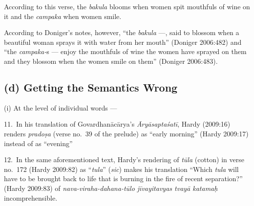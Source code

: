 According to this verse, the \textsl{bakula} blooms when women spit mouthfuls of wine on it and the \textsl{campaka} when women smile. 

According to Doniger’s notes, however, “the \textsl{bakula} ---, said to blossom when a beautiful woman sprays it with water from her mouth” (Doniger 2006:482) and “the \textsl{campaka-}s --- enjoy the mouthfuls of wine the women have sprayed on them and they blossom when the women smile on them” (Doniger 2006:483). 

\subsection*{(d) Getting the Semantics Wrong}

(i) At the level of individual words --- 

11.~In his translation of Govardhanācārya’s \textsl{Āryāsaptaśatī}, Hardy (2009:16) renders \textsl{pradoṣa} (verse no.\ 39 of the prelude) as “early morning” (Hardy 2009:17) instead of as “evening”

12.~In the same aforementioned text, Hardy’s rendering of \textsl{tūla} (cotton) in verse no.\ 172 (Hardy 2009:82) as “\textsl{tula}” (\textsl{sic}) makes his translation “Which \textsl{tula} will have to be brought back to life that is burning in the fire of recent separation?” (Hardy 2009:83) of \textsl{nava-viraha-dahana-tūlo jīvayitavyas tvayā katamaḥ} incomprehensible. 

